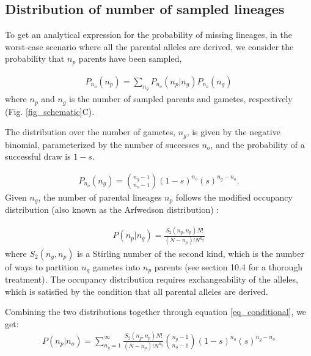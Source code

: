 \documentclass[review,nonatbib]{elsarticle}
\begin{document}
\subsection{Distribution of number of sampled lineages}
\label{parent_distribution}

To get an analytical expression for the probability of missing lineages, in the worst-case scenario
where all the parental alleles are derived, we consider the probability that $n_p$ parents have been
sampled,

\begin{equation}
  \begin{aligned}
    \label{eq_conditional}
    P_{n_o}(n_p) = \sum_{n_g} P_{n_o}(n_p | n_g)P_{n_o}(n_g)
  \end{aligned}
\end{equation}
where $n_p$ and $n_g$ is the number of sampled parents and gametes, respectively (Fig.
\ref{fig_schematic}C).

The distribution over the number of gametes, $n_g$, is given by the negative binomial,
parameterized by the number of successes $n_o$, and the probability of a successful draw is $1-s$.

\begin{equation}
  \begin{aligned}
    \label{eq_neg_binomial_trials}
    P_{n_o}(n_g) = \binom{n_g-1}{n_o-1}(1-s)^{n_o}(s)^{n_g-n_o}.
  \end{aligned}
\end{equation}
Given $n_g$, the number of parental lineages $n_p$ follows the modified occupancy distribution
(also known as the Arfwedson distribution) \citep{Wakeley2009,ONeill2019,JohnsonEtAl2005}:

\begin{equation}
  \begin{aligned}
    \label{eq_occupancy}
    P(n_p|n_g) = \frac{S_2(n_g,n_p) N!}{(N-n_p)! N^{n_g}}
  \end{aligned}
\end{equation}
where $S_2(n_g,n_p)$ is a Stirling number of the second kind, which is the number of ways to
partition $n_g$ gametes into $n_p$ parents (see \cite{JohnsonEtAl2005} section 10.4 for a thorough
treatment).
The occupancy distribution requires exchangeability of the alleles, which is satisfied by the
condition that all parental alleles are derived.

Combining the two distributions together through equation \ref{eq_conditional}, we get:
\begin{equation}
  \begin{aligned}
    \label{eq_lineages_in_past}
    P(n_p|n_o) = \sum_{n_g=1}^{\infty} \frac{S_2(n_g,n_p) N!}{(N-n_p)! N^{n_g}} \binom{n_g-1}{n_o-1}(1-s)^{n_o}(s)^{n_g-n_o}
  \end{aligned}
\end{equation}
\end{document}
